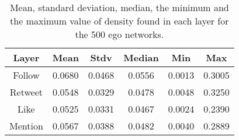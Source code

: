 \begin{table}[h!tb]
    \renewcommand{\arraystretch}{1.3}
    \caption{Mean, standard deviation, median, the minimum and the maximum value of density found in each layer for the 500 ego networks.}
    \label{tab:density}
    \centering
    \scriptsize
    \setlength\tabcolsep{6pt} %
    \begin{tabular}{|c|c|c|c|c|c|}
        \hline
        {\bf Layer} &   {\bf Mean}  & {\bf Stdv}  & {\bf Median} & {\bf Min} & {\bf Max}  \\  \hline \hline
        Follow     &    0.0680    &   0.0468  &     0.0556      &  0.0013   &  0.3005\\  \hline
        Retweet    &    0.0548    &   0.0329  &     0.0478      &  0.0048   &  0.3250\\  \hline
        Like       &    0.0525    &   0.0331  &     0.0467      &  0.0024   &  0.2390\\  \hline
        Mention    &    0.0567    &   0.0388  &     0.0482      &  0.0040   &  0.2889\\  \hline \hline 
    \end{tabular}
\end{table}